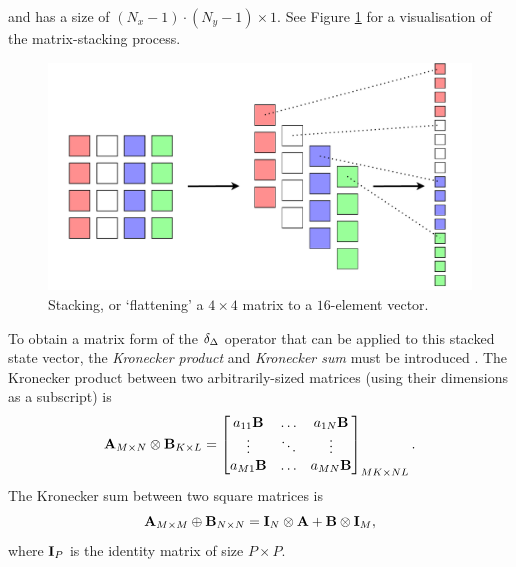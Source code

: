 and has a size of $(N_x-1)\cdot (N_y-1) \times 1$. See Figure \ref{fig:stackingMatrix} for a visualisation of the matrix-stacking process.
\begin{figure}[t]
    \centering
    \includegraphics[width=\textwidth]{figures/resonators/2d/stackingMatrix.pdf}
    \caption{Stacking, or `flattening' a $4\times 4$ matrix to a $16$-element vector. \label{fig:stackingMatrix}}
\end{figure}

To obtain a matrix form of the $\delta_{\Delta}$ operator that can be applied to this stacked state vector, the \textit{Kronecker product} and \textit{Kronecker sum} must be introduced \cite{Horn1991}. The Kronecker product between two arbitrarily-sized matrices (using their dimensions as a subscript) is
\begin{equation}
    \mathbf{A}_{M\times N} \otimes \mathbf{B}_{K\times L} = \begin{bmatrix}
        a_{11}\mathbf{B} & \hdots & a_{1N}\mathbf{B}\\
        \vdots & \ddots & \vdots\\
        a_{M1}\mathbf{B} & \hdots & a_{MN}\mathbf{B}\\
    \end{bmatrix}_{MK \times NL}.
\end{equation}
The Kronecker sum between two square matrices is \cite{Hamilton2016}
\begin{equation}
    \mathbf{A}_{M \times M} \oplus \mathbf{B}_{N \times N} = \mathbf{I}_N\otimes \mathbf{A} + \mathbf{B} \otimes\mathbf{I}_M,
\end{equation}
where $\mathbf{I}_P$ is the identity matrix of size $P\times P$. 

